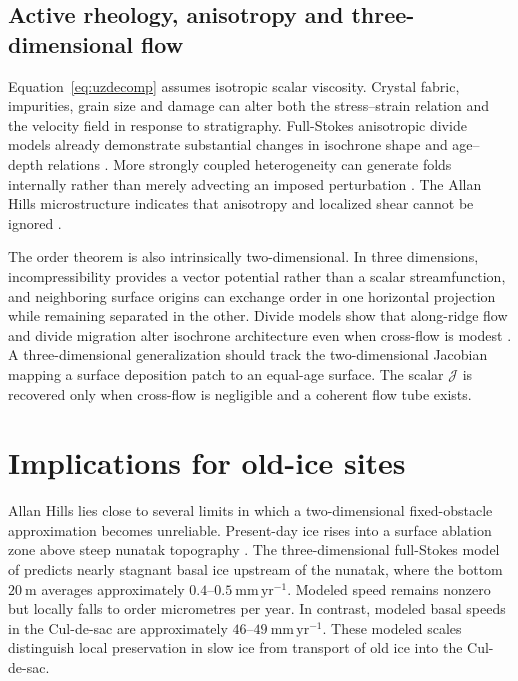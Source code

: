 \documentclass[review]{igs}
\newcommand{\parencite}{\citep}
\newcommand{\textcite}{\citet}
\theoremstyle{definition}
\theoremstyle{remark}
\newcommand{\Jord}{\mathcal{J}}
\begin{document}
\subsection{Active rheology, anisotropy and three-dimensional flow}

Equation~\eqref{eq:uzdecomp} assumes isotropic scalar viscosity. Crystal fabric, impurities, grain size and damage can alter both the stress--strain relation and the velocity field in response to stratigraphy. Full-Stokes anisotropic divide models already demonstrate substantial changes in isochrone shape and age--depth relations \parencite{MartinGudmundssonPritchardGagliardini2009}. More strongly coupled heterogeneity can generate folds internally rather than merely advecting an imposed perturbation \parencite{Alley1997,ThorsteinssonWaddington2002,Bons2016,Bons2025}. The Allan Hills microstructure indicates that anisotropy and localized shear cannot be ignored \parencite{Stoll2026}.

The order theorem is also intrinsically two-dimensional. In three dimensions, incompressibility provides a vector potential rather than a scalar streamfunction, and neighboring surface origins can exchange order in one horizontal projection while remaining separated in the other. Divide models show that along-ridge flow and divide migration alter isochrone architecture even when cross-flow is modest \parencite{MartinHindmarshNavarro2009}. A three-dimensional generalization should track the two-dimensional Jacobian mapping a surface deposition patch to an equal-age surface. The scalar \(\Jord\) is recovered only when cross-flow is negligible and a coherent flow tube exists.

\section{Implications for old-ice sites}

Allan Hills lies close to several limits in which a two-dimensional fixed-obstacle approximation becomes unreliable. Present-day ice rises into a surface ablation zone above steep nunatak topography \parencite{Spaulding2012,Kehrl2018,Stoll2026}. The three-dimensional full-Stokes model of \textcite{Manos2026} predicts nearly stagnant basal ice upstream of the nunatak, where the bottom \(20~\mathrm{m}\) averages approximately \(0.4\)--\(0.5~\mathrm{mm\,yr^{-1}}\). Modeled speed remains nonzero but locally falls to order micrometres per year. In contrast, modeled basal speeds in the Cul-de-sac are approximately \(46\)--\(49~\mathrm{mm\,yr^{-1}}\). These modeled scales distinguish local preservation in slow ice from transport of old ice into the Cul-de-sac.
\end{document}
